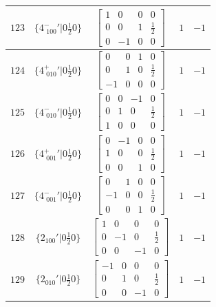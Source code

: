 \documentclass[fleqn,8pt]{jsarticle}
\begin{document}
\begin{longtable}{ccccc}
$ 123 $ & $ \{4^{-}_{\,\,100}{}'|0 \frac{1}{2} 0\} $ & $ \begin{bmatrix} 1 & 0 & 0 & 0 \\ 0 & 0 & 1 & \frac{1}{2} \\ 0 & -1 & 0 & 0 \end{bmatrix} $ & $ 1 $ & $ -1 $ \\ \hline
$ 124 $ & $ \{4^{+}_{\,\,010}{}'|0 \frac{1}{2} 0\} $ & $ \begin{bmatrix} 0 & 0 & 1 & 0 \\ 0 & 1 & 0 & \frac{1}{2} \\ -1 & 0 & 0 & 0 \end{bmatrix} $ & $ 1 $ & $ -1 $ \\ \hline
$ 125 $ & $ \{4^{-}_{\,\,010}{}'|0 \frac{1}{2} 0\} $ & $ \begin{bmatrix} 0 & 0 & -1 & 0 \\ 0 & 1 & 0 & \frac{1}{2} \\ 1 & 0 & 0 & 0 \end{bmatrix} $ & $ 1 $ & $ -1 $ \\ \hline
$ 126 $ & $ \{4^{+}_{\,\,001}{}'|0 \frac{1}{2} 0\} $ & $ \begin{bmatrix} 0 & -1 & 0 & 0 \\ 1 & 0 & 0 & \frac{1}{2} \\ 0 & 0 & 1 & 0 \end{bmatrix} $ & $ 1 $ & $ -1 $ \\ \hline
$ 127 $ & $ \{4^{-}_{\,\,001}{}'|0 \frac{1}{2} 0\} $ & $ \begin{bmatrix} 0 & 1 & 0 & 0 \\ -1 & 0 & 0 & \frac{1}{2} \\ 0 & 0 & 1 & 0 \end{bmatrix} $ & $ 1 $ & $ -1 $ \\ \hline
$ 128 $ & $ \{2{}_{100}{}'|0 \frac{1}{2} 0\} $ & $ \begin{bmatrix} 1 & 0 & 0 & 0 \\ 0 & -1 & 0 & \frac{1}{2} \\ 0 & 0 & -1 & 0 \end{bmatrix} $ & $ 1 $ & $ -1 $ \\ \hline
$ 129 $ & $ \{2{}_{010}{}'|0 \frac{1}{2} 0\} $ & $ \begin{bmatrix} -1 & 0 & 0 & 0 \\ 0 & 1 & 0 & \frac{1}{2} \\ 0 & 0 & -1 & 0 \end{bmatrix} $ & $ 1 $ & $ -1 $ \\ \hline

\end{longtable}
\end{document}
